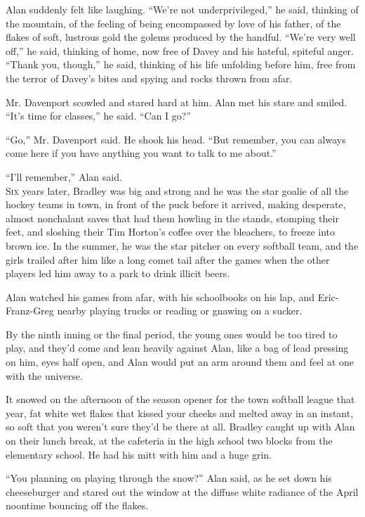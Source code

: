 Alan suddenly felt like laughing.  ``We're not underprivileged,'' he
said, thinking of the mountain, of the feeling of being encompassed by
love of his father, of the flakes of soft, lustrous gold the golems
produced by the handful.  ``We're very well off,'' he said, thinking
of home, now free of Davey and his hateful, spiteful anger.  ``Thank
you, though,'' he said, thinking of his life unfolding before him,
free from the terror of Davey's bites and spying and rocks thrown from
afar.

Mr.  Davenport scowled and stared hard at him.  Alan met his stare and
smiled.  ``It's time for classes,'' he said.  ``Can I go?''

``Go,'' Mr.  Davenport said.  He shook his head.  ``But remember, you
can always come here if you have anything you want to talk to me
about.''

``I'll remember,'' Alan said.
\\
\lettrine[lines=3, lhang=.5, nindent=0pt, findent=2pt]{S}{ix} years later, Bradley was big and strong and he was the star goalie
of all the hockey teams in town, in front of the puck before it
arrived, making desperate, almost nonchalant saves that had them
howling in the stands, stomping their feet, and sloshing their Tim
Horton's coffee over the bleachers, to freeze into brown ice.  In the
summer, he was the star pitcher on every softball team, and the girls
trailed after him like a long comet tail after the games when the
other players led him away to a park to drink illicit beers.

Alan watched his games from afar, with his schoolbooks on his lap, and
Eric-Franz-Greg nearby playing trucks or reading or gnawing on a
sucker.

By the ninth inning or the final period, the young ones would be too
tired to play, and they'd come and lean heavily against Alan, like a
bag of lead pressing on him, eyes half open, and Alan would put an arm
around them and feel at one with the universe.

It snowed on the afternoon of the season opener for the town softball
league that year, fat white wet flakes that kissed your cheeks and
melted away in an instant, so soft that you weren't sure they'd be
there at all.  Bradley caught up with Alan on their lunch break, at
the cafeteria in the high school two blocks from the elementary
school.  He had his mitt with him and a huge grin.

``You planning on playing through the snow?'' Alan said, as he set
down his cheeseburger and stared out the window at the diffuse white
radiance of the April noontime bouncing off the flakes.

